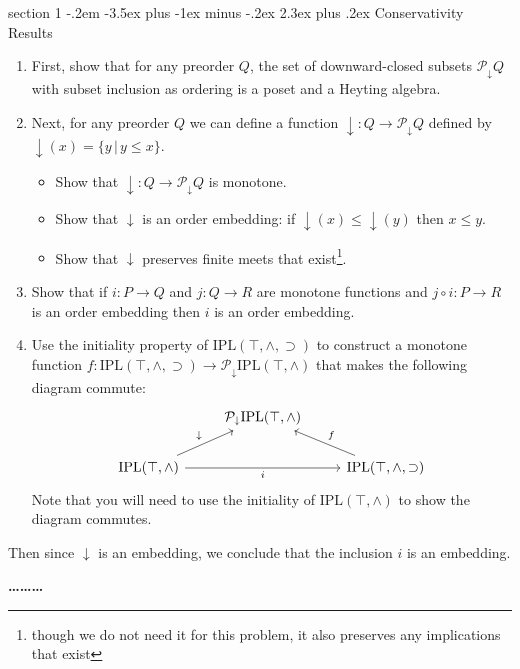 \documentclass[12pt]{article}
\makeatletter
\newenvironment{problem}{\@startsection
       {section}
       {1}
       {-.2em}
       {-3.5ex plus -1ex minus -.2ex}
       {2.3ex plus .2ex}
       {\pagebreak[3]%
       \large\bf\noindent{Problem }
       }
       }
       {%
       \begin{center}\large\bf \ldots\ldots\ldots\end{center}}
\newcommand{\meet}{\wedge}
\newcommand{\iplmeets}{\textrm{IPL}(\top,\meet)}
\newcommand{\iplneg}{\textrm{IPL}(\top,\meet,\supset)}
\newcommand{\downset}{\mathcal P_{\downarrow}}
\newcommand{\down}{{\downarrow}}
\makeatother
\begin{document}
\begin{problem}{Conservativity Results}
  \begin{enumerate}
  \item First, show that for any preorder $Q$, the set of downward-closed
    subsets $\downset Q$ with subset inclusion as ordering
    is a poset and a Heyting algebra.
  \item Next, for any preorder $Q$ we can define a function $\down : Q \to \downset Q$ defined by $\down(x) = \{ y \,|\, y \leq x \}$.
    \begin{itemize}
    \item Show that $\down : Q \to \downset Q$ is monotone.
    \item Show that $\down$ is an order embedding: if $\down(x) \leq \down(y)$ then $x \leq y$.
    \item Show that $\down$ preserves finite meets that exist\footnote{though we do not need it for this problem, it also preserves any implications that exist}.
    \end{itemize}
  \item Show that if $i : P \to Q$ and $j : Q \to R$ are monotone
    functions and $j \circ i : P \to R$ is an order embedding then $i$
    is an order embedding.
  \item Use the initiality property of $\iplneg$ to
    construct a monotone function $f : \iplneg \to
    {\downset \iplmeets}$ that makes the following diagram
    commute:
    \[\begin{tikzcd}
	& {\downset {\iplmeets}} \\
	{\iplmeets} && {\iplneg}
	\arrow["\down", from=2-1, to=1-2]
	\arrow["i"', from=2-1, to=2-3]
	\arrow["f"', from=2-3, to=1-2]
    \end{tikzcd}\]
    Note that you will need to use the initiality of $\iplmeets$
    to show the diagram commutes.
  \end{enumerate}
  Then since $\down$ is an embedding, we conclude that the inclusion $i$ is an
  embedding.
\end{problem}
\end{document}
